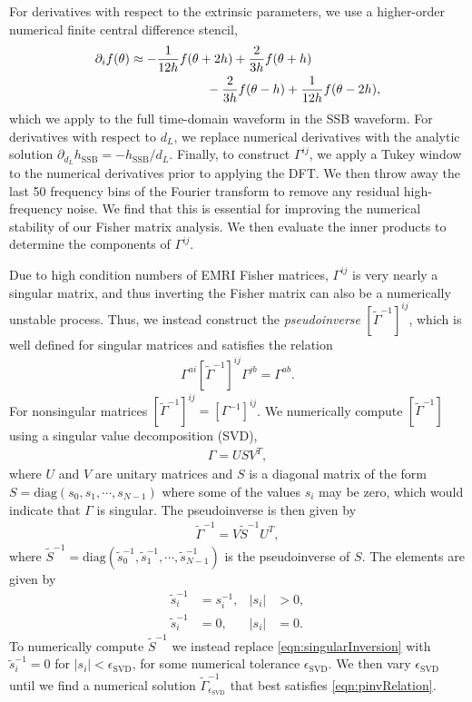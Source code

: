 \documentclass[%
 reprint,
 nofootinbib,
 amsmath,amssymb,
 aps,
 prd,
]{revtex4-2}
\begin{document}
For derivatives with respect to the extrinsic parameters, we use a higher-order numerical finite central difference stencil,
\begin{align}
    \partial_i f(\theta) &\approx -\frac{1}{12h}f(\theta + 2h) + \frac{2}{3h}f(\theta + h) 
    \\ \notag
    & \qquad \qquad \qquad - \frac{2}{3h}f(\theta - h) + \frac{1}{12h}f(\theta-2h),
\end{align}
which we apply to the full time-domain waveform in the SSB waveform. For derivatives with respect to $d_L$, we replace numerical derivatives with the analytic solution $\partial_{d_L} h_\mathrm{SSB} = -h_\mathrm{SSB}/d_L$. Finally, to construct $\Gamma^{ij}$, we apply a Tukey window to the numerical derivatives prior to applying the DFT. We then throw away the last 50 frequency bins of the Fourier transform to remove any residual high-frequency noise. We find that this is essential for improving the numerical stability of our Fisher matrix analysis. We then evaluate the inner products to determine the components of $\Gamma^{ij}$. 

Due to high condition numbers of EMRI Fisher matrices, $\Gamma^{ij}$ is very nearly a singular matrix, and thus inverting the Fisher matrix can also be a numerically unstable process. Thus, we instead construct the \emph{pseudoinverse} $[\tilde{\Gamma}^{-1}]^{ij}$, which is well defined for singular matrices and satisfies the relation
\begin{align} \label{eqn:pinvRelation}
    \Gamma^{ai}[\tilde{\Gamma}^{-1}]^{ij} \Gamma^{jb} = \Gamma^{ab}.
\end{align}
For nonsingular matrices $[\tilde{\Gamma}^{-1}]^{ij} = [{\Gamma}^{-1}]^{ij}$. We numerically compute $[\tilde{\Gamma}^{-1}]$ using a singular value decomposition (SVD),
\begin{align}
    \Gamma = U S V^T,
\end{align}
where $U$ and $V$ are unitary matrices and $S$ is a diagonal matrix of the form $S = \mathrm{diag}(s_0, s_1, \cdots, s_{N-1})$ where some of the values $s_i$ may be zero, which would indicate that $\Gamma$ is singular. The pseudoinverse is then given by
\begin{align}
    \tilde{\Gamma}^{-1} = V \tilde{S}^{-1} U^T,
\end{align}
where $\tilde{S}^{-1} = \mathrm{diag}(\tilde{s}_0^{-1}, \tilde{s}_1^{-1}, \cdots, \tilde{s}_{N-1}^{-1})$ is the pseudoinverse of $S$. The elements are given by
\begin{subequations}
    \begin{align}
    \tilde{s}_i^{-1} &= s_i^{-1}, & |s_i| &> 0,
    \\ \label{eqn:singularInversion}
    \tilde{s}_i^{-1} &= 0, & |s_i| &= 0.
\end{align}
\end{subequations}
To numerically compute $\tilde{S}^{-1}$ we instead replace \eqref{eqn:singularInversion} with $\tilde{s}_i^{-1} = 0$ for $|s_i| < \epsilon_\mathrm{SVD}$, for some numerical tolerance $\epsilon_\mathrm{SVD}$. We then vary $\epsilon_\mathrm{SVD}$ until we find a numerical solution $\tilde{\Gamma}^{-1}_{\epsilon_\mathrm{SVD}}$ that best satisfies \eqref{eqn:pinvRelation}.
\end{document}

